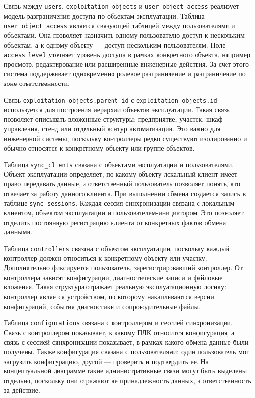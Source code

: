Связь между \texttt{users}, \texttt{exploitation\_objects} и \texttt{user\_object\_access} реализует модель разграничения доступа по объектам эксплуатации. Таблица \texttt{user\_object\_access} является связующей таблицей между пользователями и объектами. Она позволяет назначить одному пользователю доступ к нескольким объектам, а к одному объекту --- доступ нескольким пользователям. Поле \texttt{access\_level} уточняет уровень доступа в рамках конкретного объекта, например просмотр, редактирование или расширенные инженерные действия. За счет этого система поддерживает одновременно ролевое разграничение и разграничение по зоне ответственности.

Связь \texttt{exploitation\_objects.parent\_id} с \texttt{exploitation\_objects.id} используется для построения иерархии объектов эксплуатации. Такая связь позволяет описывать вложенные структуры: предприятие, участок, шкаф управления, стенд или отдельный контур автоматизации. Это важно для инженерной системы, поскольку контроллеры редко существуют изолированно и обычно относятся к конкретному объекту или группе объектов.

Таблица \texttt{sync\_clients} связана с объектами эксплуатации и пользователями. Объект эксплуатации определяет, по какому объекту локальный клиент имеет право передавать данные, а ответственный пользователь позволяет понять, кто отвечает за работу данного клиента. При выполнении обмена создается запись в таблице \texttt{sync\_sessions}. Каждая сессия синхронизации связана с локальным клиентом, объектом эксплуатации и пользователем-инициатором. Это позволяет отделить постоянную регистрацию клиента от конкретных фактов обмена данными.

Таблица \texttt{controllers} связана с объектом эксплуатации, поскольку каждый контроллер должен относиться к конкретному объекту или участку. Дополнительно фиксируется пользователь, зарегистрировавший контроллер. От контроллера зависят конфигурации, диагностические записи и файловые вложения. Такая структура отражает реальную эксплуатационную логику: контроллер является устройством, по которому накапливаются версии конфигураций, события диагностики и сопроводительные файлы.

Таблица \texttt{configurations} связана с контроллером и сессией синхронизации. Связь с контроллером показывает, к какому ПЛК относится конфигурация, а связь с сессией синхронизации показывает, в рамках какого обмена данные были получены. Также конфигурация связана с пользователями: один пользователь мог загрузить конфигурацию, другой --- проверить и подтвердить ее. На концептуальной диаграмме такие административные связи могут быть выделены отдельно, поскольку они отражают не принадлежность данных, а ответственность за действие.

